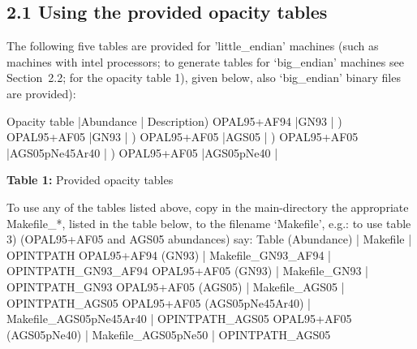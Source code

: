 \subsection{2.1 Using the provided opacity tables}
\vskip-2mm
The following five tables are provided for 'little\_endian' machines (such as 
machines with intel processors; to generate tables for `big\_endian' machines 
see Section~2.2; for the opacity table 1), given below, also
`big\_endian' binary files are provided):
\bigskip
{\small
\LeftJustifyTables
{}
 Opacity table  |Abundance      |       Description) OPAL95+AF94  |GN93           | \parasize=7.2cm
                                  ) OPAL95+AF05  |GN93           | \parasize=7.2cm
                                  ) OPAL95+AF05  |AGS05          | \parasize=7.2cm
                                  ) OPAL95+AF05  |AGS05pNe45Ar40 | \parasize=7.2cm
                                  ) OPAL95+AF05  |AGS05pNe40     | \parasize=7.2cm
\endruledtable
\bigskip
\centerline{{\bf Table 1:} Provided opacity tables}
}%
\vfill\eject
To use any of the tables listed above, copy in the main-directory the appropriate 
Makefile\_*, listed in the table below, to the 
filename `Makefile', e.g.: to use table 3) 
(OPAL95+AF05 and AGS05 abundances) say:
\smallskip
{} 
\bigskip
\bigskip
{\small
\LeftJustifyTables
{}
     Table (Abundance)       |       Makefile            |  OPINTPATH          \cr
OPAL95+AF94 (GN93)           |  Makefile\_GN93\_AF94     |  OPINTPATH\_GN93\_AF94\nr
OPAL95+AF05 (GN93)           |  Makefile\_GN93           |  OPINTPATH\_GN93     \nr
OPAL95+AF05 (AGS05)          |  Makefile\_AGS05          |  OPINTPATH\_AGS05    \nr
OPAL95+AF05 (AGS05pNe45Ar40) |  Makefile\_AGS05pNe45Ar40 |  OPINTPATH\_AGS05    \nr
OPAL95+AF05 (AGS05pNe40)     |  Makefile\_AGS05pNe50     |  OPINTPATH\_AGS05
\endruledtable
}%
